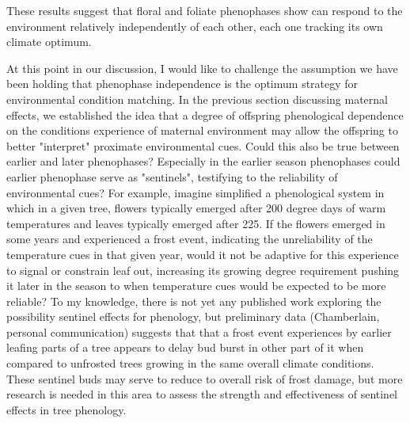 \documentclass{article}\usepackage[]{graphicx}\usepackage[]{color}
\begin{document}
These results suggest that floral and foliate phenophases show can respond to the environment relatively independently of each other, each one tracking its own climate optimum. 
\par At this point in our discussion, I would like to challenge the assumption we have been holding that phenophase independence is the optimum strategy for environmental condition matching. In the previous section discussing maternal effects, we established the idea that a degree of offspring phenological dependence on the conditions experience of maternal environment may allow the offspring to better "interpret" proximate environmental cues. Could this also be true between earlier and later phenophases? Especially in the earlier season phenophases could earlier phenophase serve as "sentinels", testifying to the reliability of environmental cues? For example, imagine simplified a phenological system in which in a given tree, flowers typically emerged after 200 degree days of warm temperatures and leaves typically emerged after 225. If the flowers emerged in some years and experienced a frost event, indicating the unreliability of the temperature cues in that given year,  would it not be adaptive for this experience to signal or constrain leaf out, increasing its growing degree requirement pushing it later in the season to when temperature cues would be expected to be more reliable? To my knowledge, there is not yet any published work exploring the possibility sentinel effects for phenology, but preliminary data (Chamberlain, personal communication) suggests that that a frost event experiences by earlier leafing parts of a tree appears to delay bud burst in other part of it when compared to unfrosted trees growing in the same overall climate conditions. These sentinel buds may serve to reduce to overall risk of frost damage, but more research is needed in this area to assess the strength and effectiveness of sentinel effects in tree phenology.
\end{document}
